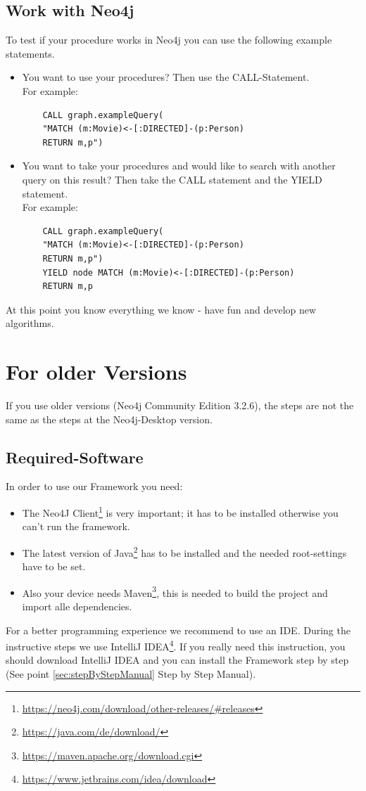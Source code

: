\section{Work with Neo4j}\label{sec:takeneo4jNew}
To test if your procedure works in Neo4j you can use the following example statements.
\begin{itemize}
	\item You want to use your procedures? Then use the CALL-Statement.\\
	For example:
	\begin{lstlisting}
	CALL graph.exampleQuery(
	"MATCH (m:Movie)<-[:DIRECTED]-(p:Person) 
	RETURN m,p")
	\end{lstlisting}
	\item You want to take your procedures and would like to search with another query on this result? Then take the CALL statement and the YIELD statement. \\
	For example:
	
	\begin{lstlisting}
	CALL graph.exampleQuery(
	"MATCH (m:Movie)<-[:DIRECTED]-(p:Person)
	RETURN m,p") 
	YIELD node MATCH (m:Movie)<-[:DIRECTED]-(p:Person)
	RETURN m,p
	\end{lstlisting}
\end{itemize}
At this point you know everything we know - have fun and develop new algorithms.
\newpage

\chapter{For older Versions} \label{chap:olderVersion}
If you use older versions (Neo4j Community Edition 3.2.6), the steps are not the same as the steps at the Neo4j-Desktop version.

\section{Required-Software}\label{sec:neededsoftware}
In order to use our Framework you need:
\begin{itemize}
	\item The Neo4J Client\footnote{\url{https://neo4j.com/download/other-releases/\#releases}} is very important; it has to be installed otherwise you can't run the framework.
	\item The latest version of Java\footnote{\url{https://java.com/de/download/}} has to be installed and the needed root-settings have to be set.
	\item Also your device needs Maven\footnote{\url{https://maven.apache.org/download.cgi}}, this is needed to build the project and import alle dependencies{}.
\end{itemize}
For a better programming experience we recommend to use an IDE. During the instructive steps we use IntelliJ IDEA\footnote{\url{https://www.jetbrains.com/idea/download}}. If you really need this instruction, you should download IntelliJ IDEA and you can install the Framework step by step (See point \ref{sec:stepByStepManual} Step by Step Manual).

